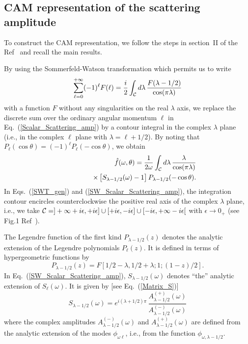\documentclass[aps,prd,longbibliography,reprint,twocolumn,amsmath,amssymb,amsfonts,showpacs,superscriptaddress]{revtex4-1}%
\begin{document}
\subsection{CAM representation of the scattering amplitude}
\label{SecIIc}

To construct the CAM representation, we follow the steps in section~II of the Ref~\cite{Folacci:2019cmc} and recall the main results.


By using the Sommerfeld-Watson transformation \cite{Watson18,Sommerfeld49,Newton:1982qc} which permits us to write
\begin{equation}\label{SWT_gen}
\sum_{\ell=0}^{+\infty} (-1)^\ell F(\ell)= \frac{i}{2} \int_{\cal C} d\lambda \, \frac{F(\lambda -1/2)}{\cos (\pi \lambda)}
\end{equation}
with a function $F$ without any singularities on the real $\lambda$ axis, we replace the discrete sum over the ordinary angular momentum $\ell$ in Eq.~(\ref{Scalar_Scattering_amp}) by a contour integral in the complex $\lambda$ plane (i.e., in the complex $\ell$ plane with $\lambda = \ell +1/2$). By noting that $P_\ell (\cos \theta)=(-1)^\ell P_\ell (-\cos \theta)$, we obtain
\begin{eqnarray}\label{SW_Scalar_Scattering_amp}
& & \hat{f}(\omega,\theta) = \frac{1}{2 \omega}  \int_{\cal C} d\lambda \, \frac{\lambda}{\cos (\pi \lambda)} \nonumber \\
&&  \qquad\qquad   \times \left[ S_{\lambda -1/2} (\omega) -1 \right]P_{\lambda -1/2} (-\cos \theta).
\end{eqnarray}
In Eqs.~(\ref{SWT_gen}) and (\ref{SW_Scalar_Scattering_amp}), the integration contour encircles counterclockwise the positive real axis of the complex $\lambda$ plane, i.e., we take ${\cal C}=]+\infty +i\epsilon,+i\epsilon] \cup
[+i\epsilon,-i\epsilon] \cup [-i\epsilon, +\infty -i\epsilon[$ with $\epsilon \to 0_+$ (see Fig.1 Ref~\cite{Folacci:2019cmc}).

The Legendre function of the first kind $P_{\lambda -1/2} (z)$ denotes the analytic extension of the Legendre polynomials $P_\ell (z)$. It is defined in terms of hypergeometric functions by \cite{AS65}
\begin{equation}\label{Def_ext_LegendreP}
P_{\lambda -1/2} (z) = F[1/2-\lambda,1/2+\lambda;1;(1-z)/2].
\end{equation}
In Eq.~(\ref{SW_Scalar_Scattering_amp}), $S_{\lambda -1/2} (\omega)$ denotes ``the'' analytic extension of $S_\ell (\omega)$. It is given by [see Eq.~(\ref{Matrix_S})]
\begin{equation}\label{Matrix_S_CAM}
  S_{\lambda -1/2}(\omega) =  e^{i(\lambda + 1/2)\pi} \, \frac{A_{\lambda -1/2}^{(+)}(\omega)}{A_{\lambda -1/2}^{(-)}(\omega)}
\end{equation}
where the complex amplitudes $A^{(-)}_{\lambda -1/2} (\omega)$ and  $A^{(+)}_{\lambda -1/2} (\omega)$ are defined from the analytic extension of the modes $\phi_{\omega \ell}$, i.e., from the function $\phi_{\omega ,\lambda -1/2}$.
\end{document}
